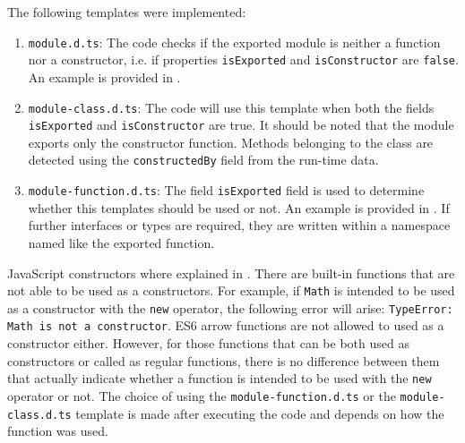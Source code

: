 The following templates were implemented:

\begin{enumerate}
  \item \texttt{module.d.ts}: The code checks if the exported module is neither a function nor a constructor, i.e. if properties \texttt{isExported} and \texttt{isConstructor} are \texttt{false}. An example is provided in .

  \item \texttt{module-class.d.ts}: The code will use this template when both the fields \texttt{isExported} and \texttt{isConstructor} are true. It should be noted that the module exports only the constructor function. Methods belonging to the class are detected using the \texttt{constructedBy} field from the run-time data.
  
  \item \texttt{module-function.d.ts}: The field \texttt{isExported} field is used to determine whether this templates should be used or not. An example is provided in . If further interfaces or types are required, they are written within a namespace named like the exported function.
\end{enumerate}







JavaScript constructors where explained in . There are built-in functions that are not able to be used as a constructors. For example, if \texttt{Math} is intended to be used as a constructor with the \texttt{new} operator, the following error will arise: \texttt{TypeError: Math is not a constructor}. ES6 arrow functions are not allowed to used as a constructor either. However, for those functions that can be both used as constructors or called as regular functions, there is no difference between them that actually indicate whether a function is intended to be used with the \texttt{new} operator or not. The choice of using the \texttt{module-function.d.ts} or the \texttt{module-class.d.ts} template is made after executing the code and depends on how the function was used.

